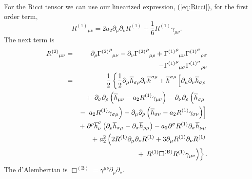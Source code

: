 \documentclass[aps,prd,amsfonts,amssymb,amsmath,nofootinbib,reprint,showpacs]{revtex4-1}
\newcommand{\eqnref}[1]{(\ref{eq:#1})}
\newcommand{\recip}[1]{\ensuremath{\frac{1}{#1}}}
\begin{document}
For the Ricci tensor we can use our linearized expression, \eqnref{Ricci}, for the first order term,
\begin{equation}
{R^{(1)}}_{\mu\nu} = 2 a_2\partial_\mu\partial_\nu R^{(1)} + \recip{6} R^{(1)}\gamma_{\mu\nu}.
\end{equation}
The next term is
\begin{eqnarray}
{R^{(2)}}_{\mu\nu} & = & \partial_\rho {{\Gamma^{(2)}}^\rho}_{\mu\nu} - \partial_\nu {{\Gamma^{(2)}}^\rho}_{\mu\rho} + {{\Gamma^{(1)}}^\rho}_{\mu\nu}{{\Gamma^{(1)}}^\sigma}_{\rho\sigma} \nonumber \\* 
 & & - {} {{\Gamma^{(1)}}^\rho}_{\mu\sigma}{{\Gamma^{(1)}}^\sigma}_{\rho\nu} \nonumber \\
 & = & \frac{1}{2}\left\{\recip{2}\partial_\mu\overline{h}_{\sigma\rho}\partial_\nu\overline{h}^{\sigma\rho} + \overline{h}^{\sigma\rho}\left[\partial_\mu\partial_\nu\overline{h}_{\sigma\rho} \vphantom{R^{(1)}} \right.\right. \nonumber \\*
 & & + \left.\left. \partial_\sigma\partial_\rho\left(\overline{h}_{\mu\nu} - a_2 R^{(1)}\gamma_{\mu\nu}\right) - \partial_\nu\partial_\rho\left(\overline{h}_{\sigma\mu} \vphantom{R^{(1)}} \right.\right.\right. \nonumber \\*
 & & - \left.\left.\left. a_2 R^{(1)} \gamma_{\sigma\mu}\right) - \partial_\mu\partial_\rho\left(\overline{h}_{\sigma\nu} - a_2 R^{(1)} \gamma_{\sigma\nu}\right)\right] \right. \nonumber \\*
 & & + \left. \partial^\rho\overline{h}^\sigma_\nu\left(\partial_\rho\overline{h}_{\sigma\mu} - \partial_\sigma\overline{h}_{\rho\mu}\right) - a_2 \partial^\sigma R^{(1)}\partial_\sigma\overline{h}_{\mu\mu} \right. \nonumber \\*
 & & + \left. a_2^2 \left(2R^{(1)}\partial_\mu\partial_\nu R^{(1)} + 3\partial_\mu R^{(1)}\partial_\nu R^{(1)} \right.\right. \nonumber \\*
 & & + \left.\left. R^{(1)} \Box^{(\text{B})} R^{(1)} \gamma_{\mu\nu}\right)\right\}.
\end{eqnarray}
The d'Alembertian is $\Box^{(\text{B})} = \gamma^{\mu\nu}\partial_\mu\partial_\nu$.
\end{document}

